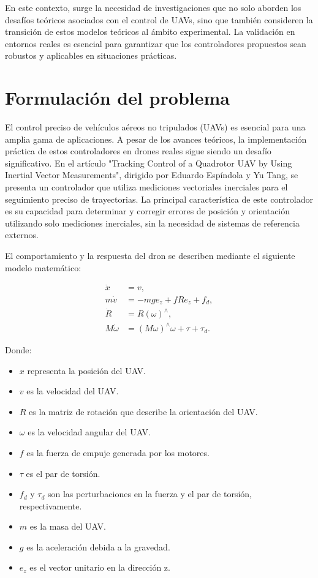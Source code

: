 En este contexto, surge la necesidad de investigaciones que no solo aborden los desafíos teóricos asociados con el control de UAVs, sino que también consideren la transición de estos modelos teóricos al ámbito experimental. La validación en entornos reales es esencial para garantizar que los controladores propuestos sean robustos y aplicables en situaciones prácticas.
\section{Formulación del problema}

El control preciso de vehículos aéreos no tripulados (UAVs) es esencial para una amplia gama de aplicaciones. A pesar de los avances teóricos, la implementación práctica de estos controladores en drones reales sigue siendo un desafío significativo. En el artículo "Tracking Control of a Quadrotor UAV by Using Inertial Vector Measurements", dirigido por Eduardo Espíndola y Yu Tang, se presenta un controlador que utiliza mediciones vectoriales inerciales para el seguimiento preciso de trayectorias. La principal característica de este controlador es su capacidad para determinar y corregir errores de posición y orientación utilizando solo mediciones inerciales, sin la necesidad de sistemas de referencia externos.

El comportamiento y la respuesta del dron se describen mediante el siguiente modelo matemático:

\begin{align*}
	\dot{x} &= v,\\
	m\dot{v} &= -mge_z + fRe_z + f_d,\\
	\dot{R} &= R(\omega)^\wedge,\\
	M\dot{\omega} &= (M\omega)^\wedge\omega + \tau + \tau_d.
\end{align*}

Donde:
\begin{itemize}
	\item \( x \) representa la posición del UAV.
	\item \( v \) es la velocidad del UAV.
	\item \( R \) es la matriz de rotación que describe la orientación del UAV.
	\item \( \omega \) es la velocidad angular del UAV.
	\item \( f \) es la fuerza de empuje generada por los motores.
	\item \( \tau \) es el par de torsión.
	\item \( f_d \) y \( \tau_d \) son las perturbaciones en la fuerza y el par de torsión, respectivamente.
	\item \( m \) es la masa del UAV.
	\item \( g \) es la aceleración debida a la gravedad.
	\item \( e_z \) es el vector unitario en la dirección z.
\end{itemize}

